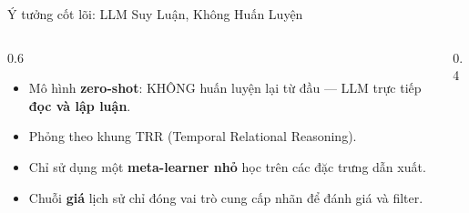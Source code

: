 \documentclass[aspectratio=169, 10pt]{beamer}
\begin{document}
\begin{frame}{Ý tưởng cốt lõi: LLM Suy Luận, Không Huấn Luyện}
    \begin{columns}
        \begin{column}{0.6\textwidth}
            \begin{itemize}
                \item Mô hình \textbf{zero-shot}: KHÔNG huấn luyện lại từ đầu — LLM trực tiếp \textbf{đọc và lập luận}.
                \item Phỏng theo khung TRR (Temporal Relational Reasoning).
                \item Chỉ sử dụng một \textbf{meta-learner nhỏ} học trên các đặc trưng dẫn xuất.
                \item Chuỗi \textbf{giá} lịch sử chỉ đóng vai trò cung cấp nhãn để đánh giá và filter.
            \end{itemize}
        \end{column}
        \begin{column}{0.4\textwidth}
            \centering
        \end{column}
    \end{columns}
\end{frame}
\end{document}
